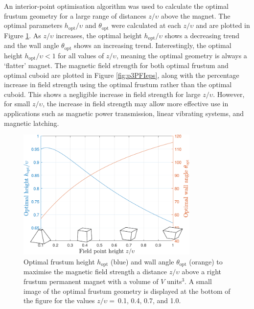 An interior-point optimisation algorithm was used to calculate the optimal frustum geometry for a large range of distances \(z/\upsilon\) above the magnet. The optimal parameters \(h_\text{opt}/\upsilon\) and \(\theta_\text{opt}\) were calculated at each \(z/\upsilon\) and are plotted in Figure \ref{fig:p3optimalFrustumGeometry}. As \(z/\upsilon\) increases, the optimal height \(h_\text{opt}/\upsilon\) shows a decreasing trend and the wall angle \(\theta_\text{opt}\) shows an increasing trend. Interestingly, the optimal height \(h_\text{opt}/\upsilon < 1\) for all values of \(z/\upsilon\), meaning the optimal geometry is always a `flatter' magnet. The magnetic field strength for both optimal frustum and optimal cuboid are plotted in Figure \ref{fig:p3PFIeps}, along with the percentage increase in field strength using the optimal frustum rather than the optimal cuboid. This shows a negligible increase in field strength for large \(z/\upsilon\). However, for small \(z/\upsilon\), the increase in field strength may allow more effective use in applications such as magnetic power transmission, linear vibrating systems, and magnetic latching.
\begin{figure}
	\centering
	\includegraphics[width=0.8\textwidth]{p3/p3FIG8}
	\caption{Optimal frustum height \(h_\text{opt}\) (blue) and wall angle \(\theta_\text{opt}\) (orange) to maximise the magnetic field strength a distance \(z/\upsilon\) above a right frustum permanent magnet with a volume of \(V\) units\(^3\). A small image of the optimal frustum geometry is displayed at the bottom of the figure for the values \(z/\upsilon =\ \)0.1, 0.4, 0.7, and 1.0.}
	\label{fig:p3optimalFrustumGeometry}
\end{figure}
